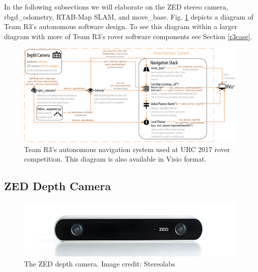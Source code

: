 \documentclass[runningheads,a4paper]{llncs}
\begin{document}
In the following subsections we will elaborate on the ZED stereo camera, rbgd\_odometry, RTAB-Map SLAM, and move\_base. Fig. \ref{fig:r3auto} depicts a diagram of Team R3's autonomous software design. To see this diagram within a larger diagram with more of Team R3's rover software components see Section \ref{r3case}.


\begin{figure}
\centering
\includegraphics[width=\textwidth]{r3auto}
\caption{Team R3's autonomous navigation system used at URC 2017 rover competition. This diagram is also available in Visio format\protect\footnotemark.}
\label{fig:r3auto}
\end{figure}





\subsection{ZED Depth Camera}\label{sec:zed}

\begin{figure}
\centering
\includegraphics[width=\textwidth]{zed}
\caption{The ZED depth camera. Image credit: Stereolabs}
\label{fig:zed}
\end{figure}
\end{document}
